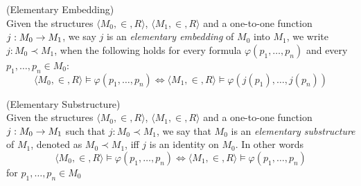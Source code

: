 \begin{definition}{(Elementary Embedding)}\label{def:elementary_embedding}\\
Given the structures $\langle M_0, \in, R \rangle$, $\langle M_1, \in, R \rangle$ and a one-to-one function $j: M_0 \rightarrow M_1$, we say $j$ is an \emph{elementary embedding} of $M_0$ into $M_1$, we write $j: M_0 \prec M_1$, when the following holds for every formula $\varphi(p_1, \ldots, p_n)$ and every $p_1, \ldots, p_n \in M_0$:
\begin{equation}
\langle M_0, \in, R \rangle \models \varphi(p_1, \ldots, p_n) \iff \langle M_1, \in, R \rangle  \models \varphi(j(p_1), \ldots, j(p_n))
\end{equation}
\end{definition}


\begin{definition}{(Elementary Substructure)}\label{def:elementary_substructure}\\
Given the structures $\langle M_0, \in, R \rangle$, $\langle M_1, \in, R \rangle$ and a one-to-one function $j: M_0 \rightarrow M_1$ such that $j: M_0 \prec M_1$, we say that $M_0$ is an \emph{elementary substructure} of $M_1$, denoted as $M_0 \prec M_1$, iff $j$ is an identity on $M_0$. In other words
\begin{equation}
\langle M_0, \in, R \rangle \models \varphi(p_1, \ldots, p_n) \iff \langle M_1, \in, R \rangle  \models \varphi(p_1, \ldots, p_n)
\end{equation}
for $p_1, \ldots, p_n \in M_0$
\end{definition}


